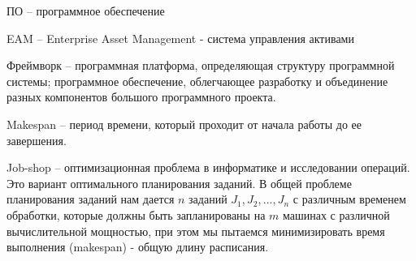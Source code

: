 
ПО -- программное обеспечение

EAM -- Enterprise Asset Management - система управления активами

Фреймворк -- программная платформа, определяющая структуру программной системы; программное обеспечение, облегчающее разработку и объединение разных компонентов большого программного проекта.

Makespan -- период времени, который проходит от начала работы до ее завершения.

Job-shop -- оптимизационная проблема в информатике и исследовании операций. Это вариант оптимального планирования заданий. В общей проблеме планирования заданий нам дается $n$ заданий $J_{1}, J_{2}, ..., J_{n}$ с различным временем обработки, которые должны быть запланированы на $m$ машинах с различной вычислительной мощностью, при этом мы пытаемся минимизировать время выполнения (makespan) - общую длину расписания.

\clearpage
